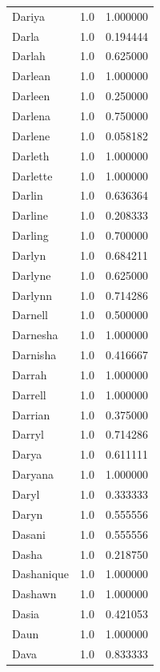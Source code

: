 \documentclass[
  letterpaper,
  DIV=11,
  numbers=noendperiod]{scrreprt}
\begin{document}
\begin{tabular}{lrr}
Dariya          &   1.0 &   1.000000 \\
Darla           &   1.0 &   0.194444 \\
Darlah          &   1.0 &   0.625000 \\
Darlean         &   1.0 &   1.000000 \\
Darleen         &   1.0 &   0.250000 \\
Darlena         &   1.0 &   0.750000 \\
Darlene         &   1.0 &   0.058182 \\
Darleth         &   1.0 &   1.000000 \\
Darlette        &   1.0 &   1.000000 \\
Darlin          &   1.0 &   0.636364 \\
Darline         &   1.0 &   0.208333 \\
Darling         &   1.0 &   0.700000 \\
Darlyn          &   1.0 &   0.684211 \\
Darlyne         &   1.0 &   0.625000 \\
Darlynn         &   1.0 &   0.714286 \\
Darnell         &   1.0 &   0.500000 \\
Darnesha        &   1.0 &   1.000000 \\
Darnisha        &   1.0 &   0.416667 \\
Darrah          &   1.0 &   1.000000 \\
Darrell         &   1.0 &   1.000000 \\
Darrian         &   1.0 &   0.375000 \\
Darryl          &   1.0 &   0.714286 \\
Darya           &   1.0 &   0.611111 \\
Daryana         &   1.0 &   1.000000 \\
Daryl           &   1.0 &   0.333333 \\
Daryn           &   1.0 &   0.555556 \\
Dasani          &   1.0 &   0.555556 \\
Dasha           &   1.0 &   0.218750 \\
Dashanique      &   1.0 &   1.000000 \\
Dashawn         &   1.0 &   1.000000 \\
Dasia           &   1.0 &   0.421053 \\
Daun            &   1.0 &   1.000000 \\
Dava            &   1.0 &   0.833333 \\

\end{tabular}
\end{document}
